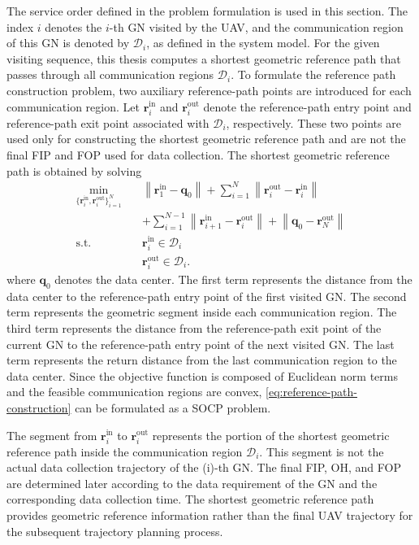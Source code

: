 \documentclass[12pt]{ksthesis}
\begin{document}
\begin{thesis}
{    The service order defined in the problem formulation is used in this section. The index \(i\) denotes the \(i\)-th GN visited by the UAV, and the communication region of this GN is denoted by \(\mathcal{D}_i\), as defined in the system model. For the given visiting sequence, this thesis computes a shortest geometric reference path that passes through all communication regions \(\mathcal{D}_i\). To formulate the reference path construction problem, two auxiliary reference-path points are introduced for each communication region. Let \(\mathbf{r}_i^{\mathrm{in}}\) and \(\mathbf{r}_i^{\mathrm{out}}\) denote the reference-path entry point and reference-path exit point associated with \(\mathcal{D}_i\), respectively. These two points are used only for constructing the shortest geometric reference path and are not the final FIP and FOP used for data collection. The shortest geometric reference path is obtained by solving
    \begin{equation}\label{eq:reference-path-construction}
    \begin{aligned}
    \min_{\{\mathbf{r}_i^{\mathrm{in}},\mathbf{r}_i^{\mathrm{out}}\}_{i=1}^{N}} \quad
    & \left\|\mathbf{r}_1^{\mathrm{in}}-\mathbf{q}_0\right\|
    + \sum_{i=1}^{N}\left\|\mathbf{r}_i^{\mathrm{out}}-\mathbf{r}_i^{\mathrm{in}}\right\| \\
    &+ \sum_{i=1}^{N-1}\left\|\mathbf{r}_{i+1}^{\mathrm{in}}-\mathbf{r}_i^{\mathrm{out}}\right\|
    + \left\|\mathbf{q}_0-\mathbf{r}_N^{\mathrm{out}}\right\| \\
    \text{s.t.} \quad
    & \mathbf{r}_i^{\mathrm{in}} \in \mathcal{D}_i \\
    & \mathbf{r}_i^{\mathrm{out}} \in \mathcal{D}_i .
    \end{aligned}
    \end{equation}
    where \(\mathbf{q}_0\) denotes the data center. The first term represents the distance from the data center to the reference-path entry point of the first visited GN. The second term represents the geometric segment inside each communication region. The third term represents the distance from the reference-path exit point of the current GN to the reference-path entry point of the next visited GN. The last term represents the return distance from the last communication region to the data center. Since the objective function is composed of Euclidean norm terms and the feasible communication regions are convex, \eqref{eq:reference-path-construction} can be formulated as a SOCP problem.

    The segment from \(\mathbf{r}_i^{\mathrm{in}}\) to \(\mathbf{r}_i^{\mathrm{out}}\) represents the portion of the shortest geometric reference path inside the communication region \(\mathcal{D}_i\). This segment is not the actual data collection trajectory of the (i)-th GN. The final FIP, OH, and FOP are determined later according to the data requirement of the GN and the corresponding data collection time. The shortest geometric reference path provides geometric reference information rather than the final UAV trajectory for the subsequent trajectory planning process.


}
\end{thesis}
\end{document}
